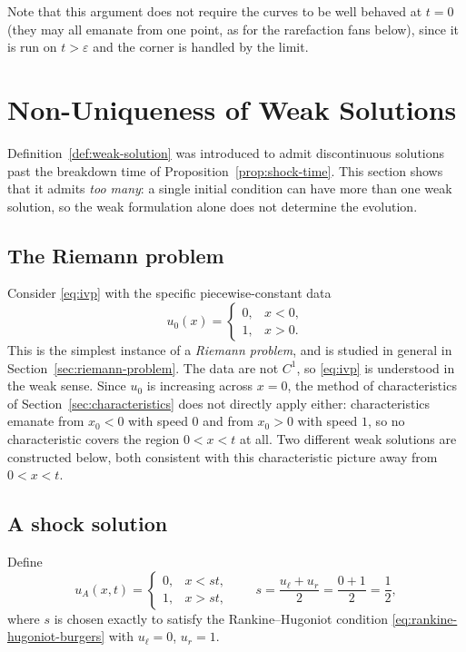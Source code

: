 Note that this argument does not require the curves to be well behaved
at $t=0$ (they may all emanate from one point, as for the rarefaction
fans below), since it is run on $t>\varepsilon$ and the corner is handled
by the limit.


\section{Non-Uniqueness of Weak Solutions}
\label{sec:nonuniqueness}

Definition~\ref{def:weak-solution} was introduced to admit discontinuous
solutions past the breakdown time of Proposition~\ref{prop:shock-time}.
This section shows that it admits \emph{too many}: a single initial
condition can have more than one weak solution, so the weak formulation
alone does not determine the evolution.

\subsection{The Riemann problem}
\label{subsec:nonuniq-setup}

Consider \eqref{eq:ivp} with the specific piecewise-constant data
\begin{equation}
  \label{eq:riemann-data}
  u_0(x) = \begin{cases} 0, & x < 0, \\ 1, & x > 0. \end{cases}
\end{equation}
This is the simplest instance of a \emph{Riemann problem}, and is studied
in general in Section~\ref{sec:riemann-problem}. The data are not $C^1$,
so \eqref{eq:ivp} is understood in the weak sense. Since $u_0$ is
increasing across $x=0$, the method of characteristics of
Section~\ref{sec:characteristics} does not directly apply either:
characteristics emanate from $x_0<0$ with speed $0$ and from $x_0>0$ with
speed $1$, so no characteristic covers the region $0<x<t$ at all. Two
different weak solutions are constructed below, both consistent with this
characteristic picture away from $0<x<t$.

\subsection{A shock solution}
\label{subsec:nonuniq-shock}

Define
\begin{equation}
  \label{eq:shock-solution}
  u_A(x,t) = \begin{cases} 0, & x < st, \\ 1, & x > st, \end{cases}
  \qquad s = \frac{u_\ell+u_r}{2} = \frac{0+1}{2} = \frac12,
\end{equation}
where $s$ is chosen exactly to satisfy the Rankine--Hugoniot condition
\eqref{eq:rankine-hugoniot-burgers} with $u_\ell=0$, $u_r=1$.

